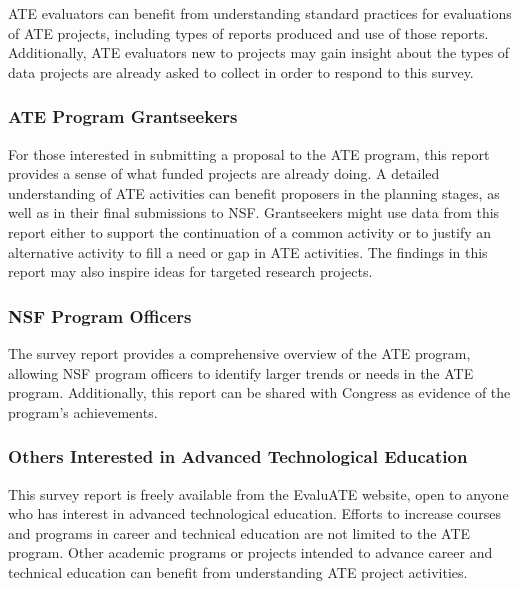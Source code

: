 \documentclass[
]{report}
\begin{document}
ATE evaluators can benefit from understanding standard practices for evaluations of ATE projects, including types of reports produced and use of those reports. Additionally, ATE evaluators new to projects may gain insight about the types of data projects are already asked to collect in order to respond to this survey.

\hypertarget{ate-program-grantseekers}{%
\subsubsection{ATE Program Grantseekers}\label{ate-program-grantseekers}}

For those interested in submitting a proposal to the ATE program, this report provides a sense of what funded projects are already doing. A detailed understanding of ATE activities can benefit proposers in the planning stages, as well as in their final submissions to NSF. Grantseekers might use data from this report either to support the continuation of a common activity or to justify an alternative activity to fill a need or gap in ATE activities. The findings in this report may also inspire ideas for targeted research projects.

\hypertarget{nsf-program-officers}{%
\subsubsection{NSF Program Officers}\label{nsf-program-officers}}

The survey report provides a comprehensive overview of the ATE program, allowing NSF program officers to identify larger trends or needs in the ATE program. Additionally, this report can be shared with Congress as evidence of the program's achievements.

\hypertarget{others-interested-in-advanced-technological-education}{%
\subsubsection{Others Interested in Advanced Technological Education}\label{others-interested-in-advanced-technological-education}}

This survey report is freely available from the EvaluATE website, open to anyone who has interest in advanced technological education. Efforts to increase courses and programs in career and technical education are not limited to the ATE program. Other academic programs or projects intended to advance career and technical education can benefit from understanding ATE project activities.
\end{document}
